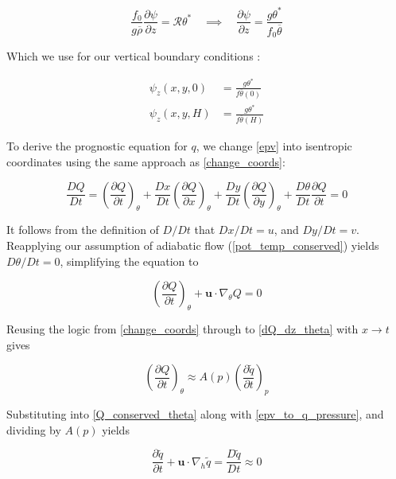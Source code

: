 \documentclass{article}
\begin{document}
\begin{equation}\label{theta_star}
    \frac{f_0}{g \overline\rho} \frac{\partial \psi}{\partial z} = \mathcal{R} \theta^* \quad \implies \quad 
\frac{\partial\psi}{\partial z} = \frac{g\theta^*}{f_0\overline\theta}
\end{equation}

Which we use for our vertical boundary conditions \cite{Barnes2022main}:

\begin{equation}\label{qgpv_bcs_vert}
\boxed{
\begin{aligned}
    \psi_z(x,y,0) &= \frac{g\theta ^*}{f\overline{\theta}(0)} \\
    \psi_z(x,y,H) &=\frac{g\theta ^*}{f\overline{\theta}\left(H\right)}
\end{aligned}
}
\end{equation}

To derive the prognostic equation for $q$, we change \cref{epv} into isentropic coordinates using the same approach as \cref{change_coords}:

\begin{equation}
    \frac{DQ}{Dt} = \left(\frac{\partial Q}{\partial t}\right)_\theta + \frac{Dx}{Dt} \left(\frac{\partial Q}{\partial x}\right)_\theta + \frac{Dy}{Dt}\left(\frac{\partial Q}{\partial y}\right)_\theta + \frac{D \theta}{Dt} \frac{\partial Q}{\partial t} = 0
\end{equation}

It follows from the definition of $D/Dt$ that $Dx/Dt = u$, and $Dy/Dt=v$.
Reapplying our assumption of adiabatic flow (\cref{pot_temp_conserved}) yields $D\theta/Dt = 0$, simplifying the equation to

\begin{equation}\label{Q_conserved_theta}
    \left(\frac{\partial Q}{\partial t}\right)_\theta + \bm{u} \cdot \nabla_\theta Q =0
\end{equation}

Reusing the logic from \cref{change_coords} through to \cref{dQ_dz_theta} with $x \to t$ gives

\begin{equation}
    \left(\frac{\partial Q}{\partial t}\right)_\theta \approx A(p) \left( \frac{\partial \tilde q}{\partial t}\right)_p
\end{equation}

Substituting into \cref{Q_conserved_theta} along with \cref{epv_to_q_pressure}, and dividing by $A(p)$ yields

\begin{equation}
    \frac{\partial \tilde q}{\partial t} + \bm{u} \cdot \nabla_h \tilde q = \frac{D \tilde q}{Dt} \approx 0
\end{equation}
\end{document}

